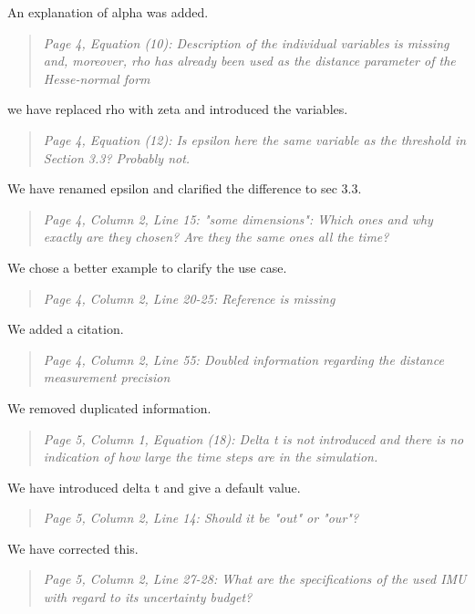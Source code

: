 \documentclass{article}
\newenvironment{itquote}
  {\begin{quote}\itshape}
  {\end{quote}\ignorespacesafterend}
\begin{document}
An explanation of alpha was added.

\begin{itquote}
Page 4, Equation (10): Description of the individual variables is
missing and, moreover, rho has already been used as the distance
parameter of the Hesse-normal form
\end{itquote}

we have replaced rho with zeta and introduced the variables.

\begin{itquote}
Page 4, Equation (12): Is epsilon here the same variable as the
threshold in Section 3.3? Probably not.
\end{itquote}

We have renamed epsilon and clarified the difference to sec 3.3.

\begin{itquote}
Page 4, Column 2, Line 15: "some dimensions": Which ones and why
exactly are they chosen? Are they the same ones all the time?
\end{itquote}

We chose a better example to clarify the use case.

\begin{itquote}
Page 4, Column 2, Line 20-25: Reference is missing
\end{itquote}

We added a citation.

\begin{itquote}
Page 4, Column 2, Line 55: Doubled information regarding the
distance measurement precision 
\end{itquote}

We removed duplicated information.

\begin{itquote}
Page 5, Column 1, Equation (18): Delta t is not introduced and there
is no indication of how large the time steps are in the simulation.
\end{itquote}

We have introduced delta t and give a default value.

\begin{itquote}
Page 5, Column 2, Line 14: Should it be "out" or "our"?
\end{itquote}

We have corrected this.

\begin{itquote}
Page 5, Column 2, Line 27-28: What are the specifications of the
used IMU with regard to its uncertainty budget?
\end{itquote}
\end{document}
